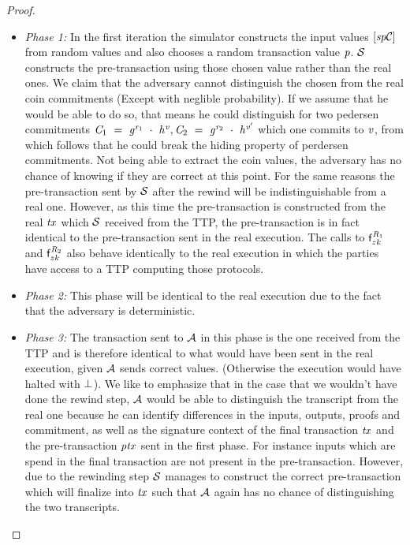 \begin{proof}
    \begin{itemize}
        \item \textit{Phase 1:} In the first iteration the simulator constructs the input values $[\mathit{sp}\mathcal{C}]$ from random values and also chooses a random transaction value $\mathit{p}$.
        $\mathcal{S}$ constructs the pre-transaction using those chosen value rather than the real ones.
        We claim that the adversary cannot distinguish the chosen from the real coin commitments (Except with neglible probability).
        If we assume that he would be able to do so, that means he could distinguish for two pedersen commitments $\mathit{C}_1 ~=~ \mathit{g}^{\mathit{r}_1} ~\cdot~ \mathit{h}^{\mathit{v}}, \mathit{C}_2 ~=~ \mathit{g}^{\mathit{r}_2} ~\cdot~ \mathit{h}^{{\mathit{v}}'}$ which one commits to $\mathit{v}$, from which follows that he could break the hiding property of perdersen commitments.
        Not being able to extract the coin values, the adversary has no chance of knowing if they are correct at this point.
        For the same reasons the pre-transaction sent by $\mathcal{S}$ after the rewind will be indistinguishable from a real one.
        However, as this time the pre-transaction is constructed from the real $\mathit{tx}$ which $\mathcal{S}$ received from the TTP, the pre-transaction is in fact identical to the pre-transaction sent in the real execution.
        The calls to $\mathsf{f}^{\mathit{R}_1}_{zk}$ and $\mathsf{f}^{\mathit{R}_2}_{zk}$ also behave identically to the real execution in which the parties have access to a TTP computing those protocols.
        \item \textit{Phase 2:} This phase will be identical to the real execution due to the fact that the adversary is deterministic.
        \item \textit{Phase 3:} The transaction sent to $\mathcal{A}$ in this phase is the one received from the TTP and is therefore identical to what would have been sent in the real execution, given $\mathcal{A}$ sends correct values. (Otherwise the execution would have halted with $\bot$).
        We like to emphasize that in the case that we wouldn't have done the rewind step, $\mathcal{A}$ would be able to distinguish the transcript from the real one because he can identify differences in the inputs, outputs, proofs and commitment, as well as the signature context of the final transaction $\mathit{tx}$ and the pre-transaction $\mathit{ptx}$ sent in the first phase.
        For instance inputs which are spend in the final transaction are not present in the pre-transaction.
        However, due to the rewinding step $\mathcal{S}$ manages to construct the correct pre-transaction which will finalize into $\mathit{tx}$ such that $\mathcal{A}$ again has no chance of distinguishing the two transcripts.
    \end{itemize}


\end{proof}
